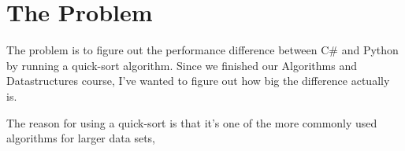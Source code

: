 \section{The Problem}

The problem is to figure out the performance difference between C\# and Python by running a quick-sort algorithm. Since we finished our Algorithms and Datastructures course, I've wanted to figure out how big the difference actually is.

\noindent The reason for using a quick-sort is that it's one of the more commonly used algorithms for larger data sets\cite{best_sort_alg},